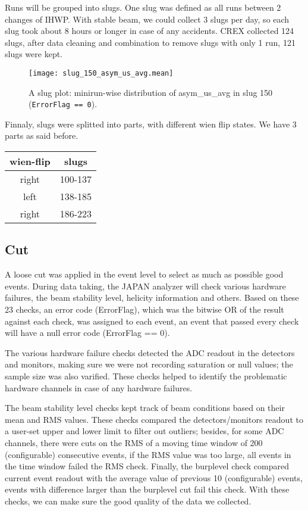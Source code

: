 Runs will be grouped into slugs. One slug was defined as all runs between 2
changes of IHWP. With stable beam, we could collect 3 slugs per day, so 
each slug took about 8 hours or longer in case of any accidents. CREX collected
124 slugs, after data cleaning and combination to remove slugs with only 1 run, 
121 slugs were kept.
\begin{figure}
    \centering
    \texttt{[image: slug\_150\_asym\_us\_avg.mean]}
    \caption{A slug plot: minirun-wise distribution of asym\_us\_avg in slug 150 
    (\texttt{ErrorFlag == 0}).}
\end{figure}

Finnaly, slugs were splitted into parts, with different wien flip states. We
have 3 parts as said before.
\begin{table}[!h]
    \centering
    \begin{tabular}{c | c}
	\hline
	wien-flip   & slugs \\
	\hline
	right	& 100-137   \\
	left	& 138-185   \\
	right	& 186-223   \\
	\hline
    \end{tabular}
\end{table}

\subsection{Cut}
A loose cut was applied in the event level to select as much as possible good events.
During data taking, the JAPAN analyzer will check various hardware failures, the
beam stability level, helicity information and others. Based on these 23 checks,
an error code (ErrorFlag), which was the bitwise OR of the result against each
check, was assigned to each event, an event that passed every check will have
a null error code (ErrorFlag == 0). 

The various hardware failure checks detected the ADC readout in the detectors and
monitors, making sure we were not recording saturation or null values; the 
sample size was also varified. These checks helped to identify the problematic
hardware channels in case of any hardware failures.

The beam stability level checks kept track of beam conditions based on their
mean and RMS values. These checks compared the detectors/monitors readout to 
a user-set upper and lower limit to filter out outliers; besides, for some ADC 
channels, there were cuts on the RMS of a moving time window of 200 (configurable) %
consecutive events, 
if the RMS value was too large, all events in the time window failed the RMS check. 
Finally, the burplevel check compared current event readout with the average
value of previous 10 (configurable) events, events with difference larger than
the burplevel cut fail this check. With these checks, we can make sure the good 
quality of the data we collected.

